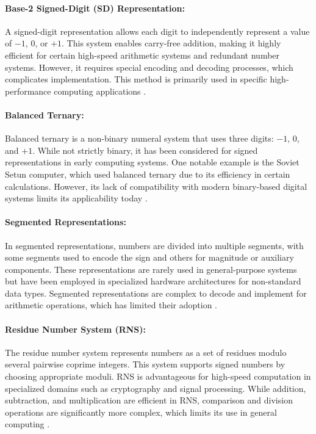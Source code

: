 \paragraph{Base-2 Signed-Digit (SD) Representation: } 
A signed-digit representation allows each digit to independently represent a value of \(-1\), \( 0 \), or \( +1 \). This system enables carry-free addition, making it highly efficient for certain high-speed arithmetic systems and redundant number systems. However, it requires special encoding and decoding processes, which complicates implementation. This method is primarily used in specific high-performance computing applications \cite{koren2002}.

\paragraph{Balanced Ternary: }
Balanced ternary is a non-binary numeral system that uses three digits: \(-1\), \( 0 \), and \( +1 \). While not strictly binary, it has been considered for signed representations in early computing systems. One notable example is the Soviet Setun computer, which used balanced ternary due to its efficiency in certain calculations. However, its lack of compatibility with modern binary-based digital systems limits its applicability today \cite{lukyanov1961}.

\paragraph{Segmented Representations: }
In segmented representations, numbers are divided into multiple segments, with some segments used to encode the sign and others for magnitude or auxiliary components. These representations are rarely used in general-purpose systems but have been employed in specialized hardware architectures for non-standard data types. Segmented representations are complex to decode and implement for arithmetic operations, which has limited their adoption \cite{smith1991}.

\paragraph{Residue Number System (RNS): }
The residue number system represents numbers as a set of residues modulo several pairwise coprime integers. This system supports signed numbers by choosing appropriate moduli. RNS is advantageous for high-speed computation in specialized domains such as cryptography and signal processing. While addition, subtraction, and multiplication are efficient in RNS, comparison and division operations are significantly more complex, which limits its use in general computing \cite{heydari2016}.

